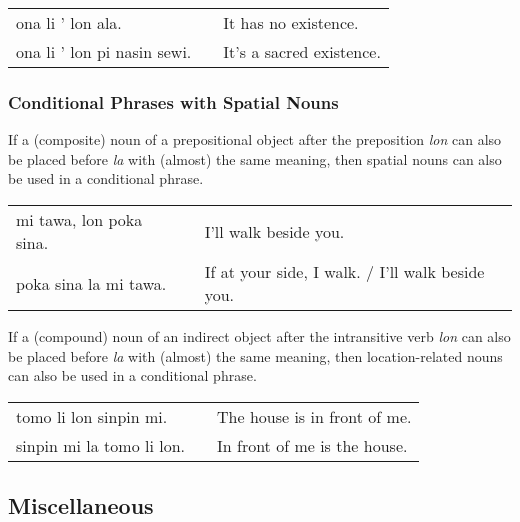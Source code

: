 \begin{supertabular}{p{5,5cm}|ll}
    ona li ' lon ala.           &  & It has no existence.     \\
    ona li ' lon pi nasin sewi. &  & It's a sacred existence. \\
\end{supertabular}

%
%
\subsubsection*{Conditional Phrases with Spatial Nouns}
%
%

If a (composite) noun of a prepositional object after the preposition \textit{lon} can also be placed before \textit{la} with (almost) the same meaning, then spatial nouns can also be used in a conditional phrase.

\begin{supertabular}{p{5,5cm}|ll}
    mi tawa, lon poka sina. &  & I'll walk beside you.                            \\
    poka sina la mi tawa.   &  & If at your side, I walk. / I'll walk beside you. \\
\end{supertabular}

If a (compound) noun of an indirect object after the intransitive verb \textit{lon} can also be placed before \textit{la} with (almost) the same meaning, then location-related nouns can also be used in a conditional phrase.

\begin{supertabular}{p{5,5cm}|ll}
    tomo li lon sinpin mi.    &  & The house is in front of me. \\
    sinpin mi la tomo li lon. &  & In front of me is the house. \\
\end{supertabular}

%
\subsection*{Miscellaneous}
%
%
